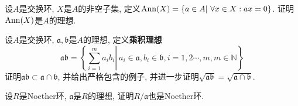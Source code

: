 \begin{ex}
    设$A$是交换环, $X$是$A$的非空子集, 定义$\operatorname{Ann}(X)=\{a\in A|\ \forall x\in X:ax=0\}$.
    证明$\operatorname{Ann}(X)$是$A$的理想.
\end{ex}

\begin{ex}
    设$A$是交换环, $\mathfrak{a},\mathfrak{b}$是$A$的理想, 定义\textbf{乘积理想}
    \[\mathfrak{a}\mathfrak{b}=\left\{\left.\sum_{i=1}^ma_ib_i\right|\ a_i\in\mathfrak{a},b_i\in\mathfrak{b},i=1,2\cdots,m,m\in\mathbb{N}\right\}\]
    证明$\mathfrak{a}\mathfrak{b}\subset\mathfrak{a}\cap\mathfrak{b}$, 并给出严格包含的例子, 并进一步证明$\sqrt{\mathfrak{a}\mathfrak{b}}=\sqrt{\mathfrak{a}\cap\mathfrak{b}}$.
\end{ex}

\begin{ex}
    设$R$是Noether环, $\mathfrak{a}$是$R$的理想, 证明$R/\mathfrak{a}$也是Noether环.
\end{ex}